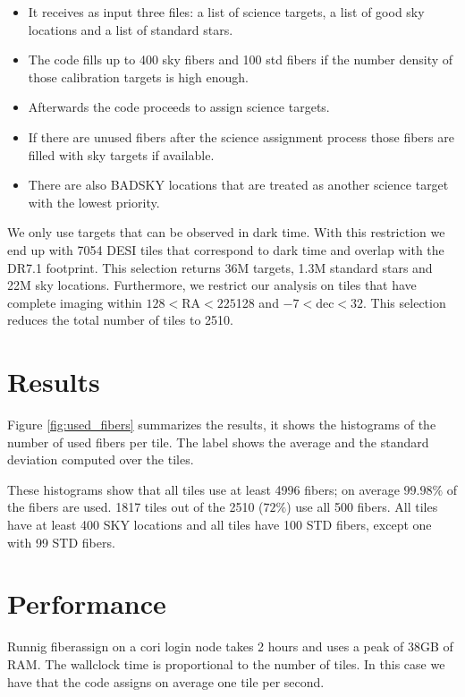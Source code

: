 \documentclass{article}
\begin{document}
\begin{itemize}
\item It receives as input three files: a list of science targets, a
  list of good sky locations and a list of standard
  stars. 
\item The code fills up to 400 sky fibers and 100 std fibers if the
  number density of those calibration targets is high enough.
\item Afterwards the code proceeds to assign science targets.
\item If there are unused fibers after the science assignment process
  those fibers are filled with sky targets if available.
\item There are also BADSKY locations that are treated as another
  science target with the lowest priority.
\end{itemize}



We only use targets that can be observed in dark time. 
With this restriction we end up with 7054 DESI tiles that correspond
to dark time and overlap with the DR7.1 footprint. 
This selection returns 36M targets, 1.3M standard stars and
22M sky locations.
Furthermore, we restrict our analysis on tiles that have complete imaging
within $128<$RA$<225$128 and $-7<$dec$<32$.  This selection reduces
the total number of tiles to 2510. 

\section{Results}

Figure \ref{fig:used_fibers} summarizes the results, it shows the
histograms of the number of used fibers per tile.
The label shows the average and the standard deviation computed over
the tiles. 

These histograms show that all tiles use at least 4996 fibers; 
on average $99.98\%$ of the fibers are used.
1817 tiles out of the 2510 ($72\%$) use all 500 fibers.
All tiles have at least 400 SKY locations and all tiles have 100 STD
fibers, except one with 99 STD fibers. 

\section{Performance}
Runnig fiberassign on a cori login node takes 2 hours and  uses a
peak of 38GB of RAM.
The wallclock time is proportional to the number
of tiles. In this case we have that the code assigns on average one
tile per second. 
\end{document}
